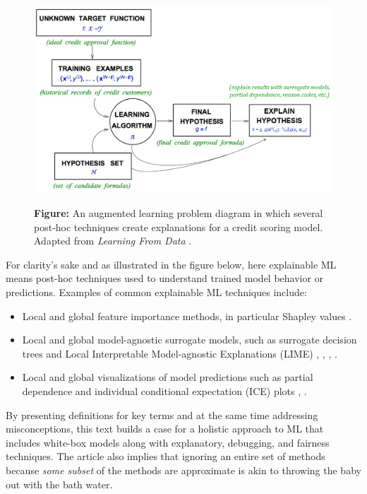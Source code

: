 \documentclass{article}
\begin{document}
\begin{figure}[htb]
	\begin{center}
		\includegraphics[scale=0.33]{img/figure_1.png}
		\label{fig:learning_problem}
		\captionsetup{labelformat=empty}
		\caption{\textbf{Figure:} An augmented learning problem diagram in which several post-hoc techniques create explanations for a credit scoring model. Adapted from \textit{Learning From Data} \cite{lfd}.}
	\end{center}
\end{figure}	

For clarity's sake and as illustrated in the figure below, here explainable ML means post-hoc techniques used to understand trained model behavior or predictions. Examples of common explainable ML techniques include:

\begin{itemize}
\item Local and global feature importance methods, in particular Shapley values \cite{shapley}.
\item Local and global model-agnostic surrogate models, such as surrogate decision trees and Local Interpretable Model-agnostic Explanations (LIME) \cite{dt_surrogate1}, \cite{dt_surrogate2}, \cite{lime-sup}, \cite{lime}. 
\item Local and global visualizations of model predictions such as partial dependence and individual conditional expectation (ICE) plots \cite{esl}, \cite{ice_plots}.
\end{itemize}

By presenting definitions for key terms and at the same time addressing misconceptions, this text builds a case for a holistic approach to ML that includes white-box models along with explanatory, debugging, and fairness techniques. The article also implies that ignoring an entire set of methods because \textit{some subset} of the methods are approximate is akin to throwing the baby out with the bath water. 
\end{document}
